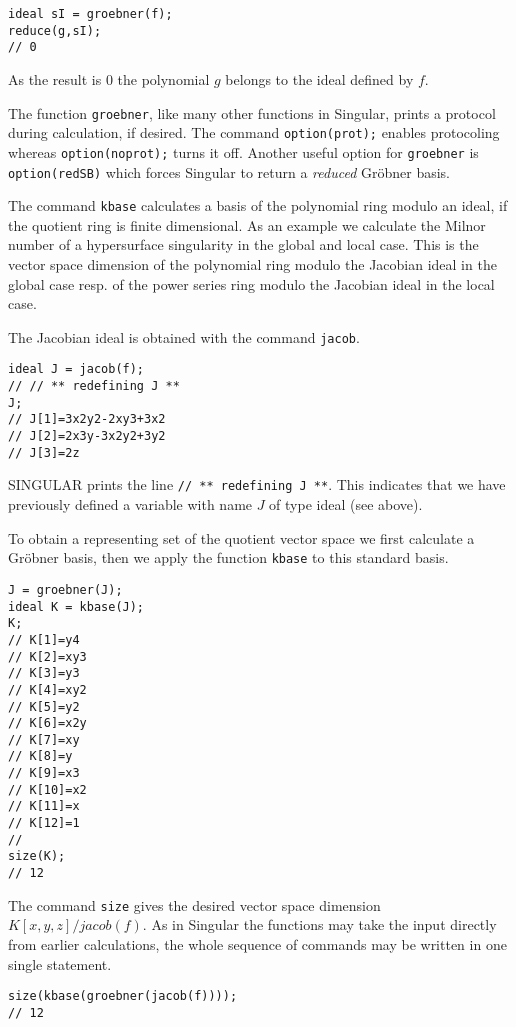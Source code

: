 \documentclass[12pt]{amsart}
\begin{document}
\begin{verbatim}
ideal sI = groebner(f);
reduce(g,sI);
// 0
\end{verbatim}

As the result is $0$ the polynomial $g$ belongs to the ideal defined by $f$.

The function \texttt{groebner}, like many other functions in Singular, prints a protocol during calculation, 
if desired. The command \verb+option(prot);+ enables protocoling whereas \verb+option(noprot);+ turns it off.
Another useful option for \texttt{groebner} is \verb+option(redSB)+ which forces Singular to return a \emph{reduced}
Gr\"obner basis. 

The command \texttt{kbase} calculates a basis of the polynomial ring modulo an ideal, 
if the quotient ring is finite dimensional. As an example we calculate the Milnor number of a 
hypersurface singularity in the global and local case. This is the vector space dimension of the polynomial ring modulo the 
Jacobian ideal in the global case resp. of the power series ring modulo the Jacobian ideal in the local case. 

The Jacobian ideal is obtained with the command \texttt{jacob}.

\begin{verbatim}
ideal J = jacob(f);
// // ** redefining J **
J;
// J[1]=3x2y2-2xy3+3x2
// J[2]=2x3y-3x2y2+3y2
// J[3]=2z
\end{verbatim}

SINGULAR prints the line \verb+// ** redefining J **+. This indicates that we have previously defined a variable with 
name $J$ of type ideal (see above).

To obtain a representing set of the quotient vector space we first calculate a Gr\"obner basis, then 
we apply the function \texttt{kbase} to this standard basis.

\begin{verbatim}
J = groebner(J);
ideal K = kbase(J);
K;
// K[1]=y4
// K[2]=xy3
// K[3]=y3
// K[4]=xy2
// K[5]=y2
// K[6]=x2y
// K[7]=xy
// K[8]=y
// K[9]=x3
// K[10]=x2
// K[11]=x
// K[12]=1
//
size(K);
// 12
\end{verbatim}

The command \texttt{size} gives the desired vector space 
dimension $K[x,y,z]/jacob(f)$. As in Singular the functions may take the input directly from earlier calculations, 
the whole sequence of commands may be written in one single statement.

\begin{verbatim}
size(kbase(groebner(jacob(f))));
// 12
\end{verbatim}
\end{document}
